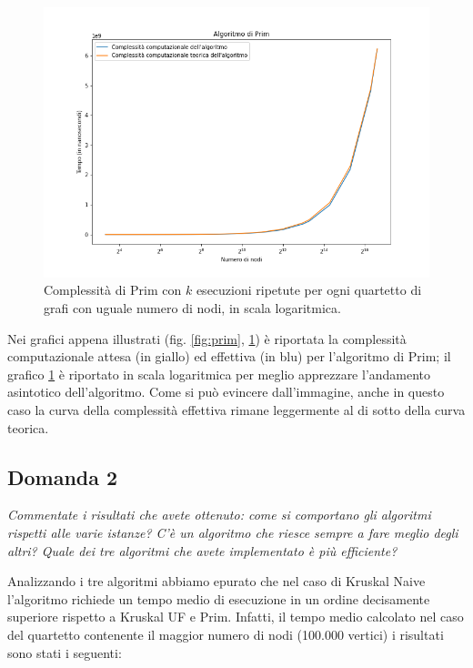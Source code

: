 \begin{figure}[H]
	\centering
	\includegraphics[width=1\textwidth]{res/images/graph-log/prim_scala_logaritmica.png}
	\caption{Complessità di Prim con \(k\) esecuzioni ripetute per ogni quartetto di grafi con uguale numero di nodi, in scala logaritmica.}
	\label{fig:prim_log}
\end{figure}


Nei grafici appena illustrati (fig. \ref{fig:prim}, \ref{fig:prim_log}) è riportata la complessità computazionale attesa (in giallo) ed effettiva (in blu) per l'algoritmo di Prim; il grafico \ref{fig:prim_log} è riportato in scala logaritmica per meglio apprezzare l'andamento asintotico dell'algoritmo.
Come si può evincere dall'immagine, anche in questo caso la curva della complessità effettiva rimane leggermente al di sotto della curva teorica.




\subsection{Domanda 2}
\textit{Commentate i risultati che avete ottenuto: come si comportano gli
algoritmi rispetti alle varie istanze? C'è un algoritmo che riesce sempre a fare meglio
degli altri? Quale dei tre algoritmi che avete implementato è più efficiente?}


Analizzando i tre algoritmi abbiamo epurato che nel caso di Kruskal Naive l'algoritmo richiede un tempo medio di esecuzione in un ordine decisamente superiore rispetto a Kruskal UF e Prim. Infatti, il tempo medio calcolato nel caso del quartetto contenente il maggior numero di nodi (100.000 vertici) i risultati sono stati i seguenti:

